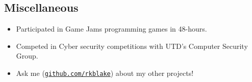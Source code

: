 \documentclass[line,margin]{res}
\begin{document}
\begin{resume}
\vspace{-4pt}
\section{Miscellaneous}
\vspace{22pt}
	\begin{itemize} \itemsep -2pt
	\item Participated in Game Jams programming games in 48-hours.
	\item Competed in Cyber security competitions with UTD's Computer Security Group.
	\item Ask me (\href{https://github.com/rkblake}{\texttt{github.com/rkblake}}) about my other projects!
	\end{itemize}

\end{resume}
\end{document}
